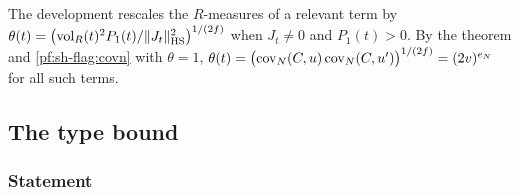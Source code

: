 \begin{remark}\label{pf:sh-flag:rem:jfact}
The development rescales the $R$-measures of a relevant term by
$\theta(t)=\bigl(\operatorname{vol}_R(t)^2P_1(t)/\|J_t\|_{\mathrm{HS}}^2\bigr)^{1/(2f)}$ when $J_t\ne0$ and $P_1(t)>0$. By the theorem and
\cref{pf:sh-flag:covn} with $\theta=1$, $\theta(t)=\bigl(\operatorname{cov}_N(C,u)\operatorname{cov}_N(C,u')\bigr)^{1/(2f)}=(2v)^{e_N}$ for all such
terms.
\end{remark}

\subsection{The type bound}\label{sec:pf:sh-flag:type}

\subsubsection{Statement}

